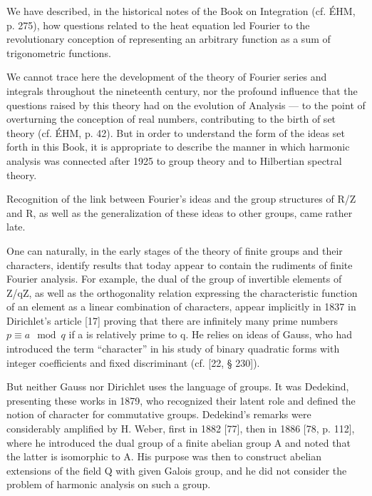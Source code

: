 
We have described, in the historical notes of the Book on Integration (cf. ÉHM, p. 275), how questions related to the heat equation led Fourier to the revolutionary conception of representing an arbitrary function as a sum of trigonometric functions.

We cannot trace here the development of the theory of Fourier series and integrals throughout the nineteenth century, nor the profound influence that the questions raised by this theory had on the evolution of Analysis --- to the point of overturning the conception of real numbers, contributing to the birth of set theory (cf. ÉHM, p. 42). But in order to understand the form of the ideas set forth in this Book, it is appropriate to describe the manner in which harmonic analysis was connected after 1925 to group theory and to Hilbertian spectral theory.

Recognition of the link between Fourier's ideas and the group structures of R/Z and R, as well as the generalization of these ideas to other groups, came rather late.

One can naturally, in the early stages of the theory of finite groups and their characters, identify results that today appear to contain the rudiments of finite Fourier analysis. For example, the dual of the group of invertible elements of Z/qZ, as well as the orthogonality relation expressing the characteristic function of an element as a linear combination of characters, appear implicitly in 1837 in Dirichlet's article {[}17{]} proving that there are infinitely many prime numbers \(p \equiv a \mod q\) if a is relatively prime to q. He relies on ideas of Gauss, who had introduced the term “character” in his study of binary quadratic forms with integer coefficients and fixed discriminant (cf. {[}22, § 230{]}).

But neither Gauss nor Dirichlet uses the language of groups. It was Dedekind, presenting these works in 1879, who recognized their latent role and defined the notion of character for commutative groups. Dedekind's remarks were considerably amplified by H. Weber, first in 1882 {[}77{]}, then in 1886 {[}78, p. 112{]}, where he introduced the dual group of a finite abelian group A and noted that the latter is isomorphic to A. His purpose was then to construct abelian extensions of the field Q with given Galois group, and he did not consider the problem of harmonic analysis on such a group.


